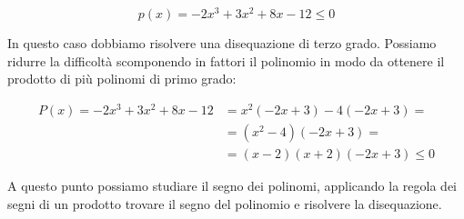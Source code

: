 \begin{esempio}
 \[p(x)=-2x^3+3x^2+8x-12 \le 0\]

In questo caso dobbiamo risolvere una disequazione di terzo grado. 
Possiamo ridurre la difficoltà scomponendo in fattori il polinomio in modo da 
ottenere il prodotto di più polinomi di primo grado: 

\begin{align*}
P(x) = -2x^3+3x^2+8x-12 &= x^2(-2x+3)-4(-2x+3) = \\
                        &= (x^2-4)(-2x+3) = \\
                        &= (x-2)(x+2)(-2x+3) \le 0
\end{align*}

\begin{minipage}{.65\textwidth}

A questo punto possiamo studiare il segno dei polinomi, applicando la regola 
dei segni di un prodotto trovare il segno del polinomio e risolvere la 
disequazione.

\end{minipage}
\begin{minipage}{.30\textwidth}

\begin{inaccessibleblock}
\begin{center}
  
\end{center}
\end{inaccessibleblock}
\end{minipage}

\newpage %


\end{esempio}
